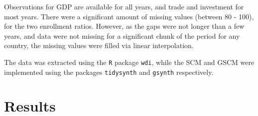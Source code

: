 \documentclass[12pt,nobind, a4paper]{reedthesis}
\begin{document}
 Observations for GDP are available for all years, and trade and investment for most years. There were a significant amount of missing values (between 80 - 100), for the two enrollment ratios. However, as the gaps were not longer than a few years, and data were not missing for a significant chunk of the period for any country, the missing values were filled via linear interpolation.
 \linebreak

 The data was extracted using the \texttt{R} package \texttt{wdi}, while the SCM and GSCM were implemented using the packages \texttt{tidysynth} and \texttt{gsynth} respectively.

 \hypertarget{results}{%
 \section{Results}\label{results}}
\end{document}
